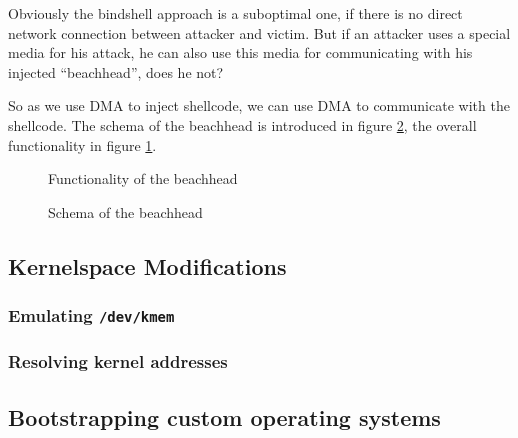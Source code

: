 Obviously the bindshell approach is a suboptimal one, if there is no direct
network connection between attacker and victim. But if an attacker uses a
special media for his attack, he can also use this media for communicating with
his injected ``beachhead'', does he not?

So as we use DMA to inject shellcode, we can use DMA to communicate with the
shellcode. The schema of the beachhead is introduced in figure
\ref{fig:schema_beachhead}, the overall functionality in figure
\ref{fig:functionality_beachhead}.

\begin{figure}[ht] \begin{center}

	\epsfysize 6cm


	\caption{Functionality of the beachhead}

	\label{fig:functionality_beachhead}

\end{center}\end{figure}


\begin{figure}[ht] \begin{center}



	\caption{Schema of the beachhead}

	\label{fig:schema_beachhead}

\end{center}\end{figure}



\subsection{Kernelspace Modifications}

\subsubsection{Emulating \texttt{/dev/kmem}}

\subsubsection{Resolving kernel addresses}





\subsection{Bootstrapping custom operating systems}

